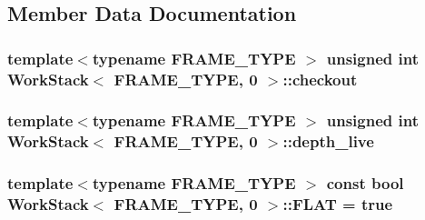 \subsection{Member Data Documentation}
\hypertarget{structWorkStack_3_01FRAME__TYPE_00_010_01_4_ab014d043b3a22f72a6abc16b11b8eeb4}{
\subsubsection[{checkout}]{\setlength{\rightskip}{0pt plus 5cm}template$<$typename F\-R\-A\-M\-E\-\_\-\-T\-Y\-P\-E $>$ unsigned int {\bf Work\-Stack}$<$ F\-R\-A\-M\-E\-\_\-\-T\-Y\-P\-E, 0 $>$\-::checkout}}\label{structWorkStack_3_01FRAME__TYPE_00_010_01_4_ab014d043b3a22f72a6abc16b11b8eeb4}
\hypertarget{structWorkStack_3_01FRAME__TYPE_00_010_01_4_a81fc3684b4f5f68e3c7fd820f8d533cd}{
\subsubsection[{depth\-\_\-live}]{\setlength{\rightskip}{0pt plus 5cm}template$<$typename F\-R\-A\-M\-E\-\_\-\-T\-Y\-P\-E $>$ unsigned int {\bf Work\-Stack}$<$ F\-R\-A\-M\-E\-\_\-\-T\-Y\-P\-E, 0 $>$\-::depth\-\_\-live}}\label{structWorkStack_3_01FRAME__TYPE_00_010_01_4_a81fc3684b4f5f68e3c7fd820f8d533cd}
\hypertarget{structWorkStack_3_01FRAME__TYPE_00_010_01_4_abe93d19be620f72321619c2a88aedb1e}{
\subsubsection[{F\-L\-A\-T}]{\setlength{\rightskip}{0pt plus 5cm}template$<$typename F\-R\-A\-M\-E\-\_\-\-T\-Y\-P\-E $>$ const bool {\bf Work\-Stack}$<$ F\-R\-A\-M\-E\-\_\-\-T\-Y\-P\-E, 0 $>$\-::F\-L\-A\-T = true\hspace{0.3cm}{\ttfamily [static]}}}\label{structWorkStack_3_01FRAME__TYPE_00_010_01_4_abe93d19be620f72321619c2a88aedb1e}
